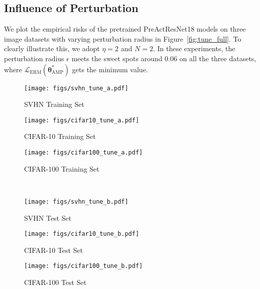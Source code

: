 \documentclass[final]{cvpr}
\begin{document}
\subsection{Influence of Perturbation}\label{app:e}

We plot the empirical risks of the pretrained PreActResNet18 models on three image datasets with varying perturbation radius in Figure~\ref{fig:tune_full}. To clearly illustrate this, we adopt $\eta=2$ and $N=2$. In these experiments, the perturbation radius $\epsilon$ meets the sweet spots around $0.06$ on all the three datasets, where $\mathcal{L}_\mathrm{ERM}(\boldsymbol{\theta}_\mathrm{AMP}^\ast)$ gets the minimum value. 

\begin{figure*}[t]
\centering
\begin{subfigure}{0.66\columnwidth}\centering \captionsetup{width=0.9\columnwidth}\texttt{[image: figs/svhn\_tune\_a.pdf]}\caption{SVHN Training Set}\end{subfigure}\begin{subfigure}{0.66\columnwidth}\centering \captionsetup{width=0.9\columnwidth}\texttt{[image: figs/cifar10\_tune\_a.pdf]}\caption{CIFAR-10 Training Set}\end{subfigure}\begin{subfigure}{0.66\columnwidth}\centering \captionsetup{width=0.9\columnwidth}\texttt{[image: figs/cifar100\_tune\_a.pdf]}\caption{CIFAR-100 Training Set}\end{subfigure}\\
\begin{subfigure}{0.66\columnwidth}\centering \captionsetup{width=0.9\columnwidth}\texttt{[image: figs/svhn\_tune\_b.pdf]}\caption{SVHN Test Set}\end{subfigure}\begin{subfigure}{0.66\columnwidth}\centering \captionsetup{width=0.9\columnwidth}\texttt{[image: figs/cifar10\_tune\_b.pdf]}\caption{CIFAR-10 Test Set}\end{subfigure}\begin{subfigure}{0.66\columnwidth}\centering \captionsetup{width=0.9\columnwidth}\texttt{[image: figs/cifar100\_tune\_b.pdf]}\caption{CIFAR-100 Test Set}\end{subfigure}\caption{The comparison of $\mathcal{L}_{\rm ERM}$ of the models trained with ERM (red) and AMP (blue) with varying perturbation radius.}
\label{fig:tune_full}
\end{figure*}
\end{document}

